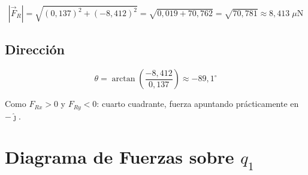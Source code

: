 \documentclass[12pt,letterpaper]{article}
\begin{document}
\begin{equation*}
|\vec{F}_R| = \sqrt{(0{,}137)^2 + (-8{,}412)^2}
= \sqrt{0{,}019 + 70{,}762}
= \sqrt{70{,}781}
\approx 8{,}413\;\mu\text{N}
\end{equation*}

\subsection*{Direcci\'on}

\begin{equation*}
\theta = \arctan\!\left(\frac{-8{,}412}{0{,}137}\right) \approx -89{,}1^\circ
\end{equation*}

Como $F_{Rx}>0$ y $F_{Ry}<0$: cuarto cuadrante, fuerza apuntando pr\'acticamente en $-\hat{\jmath}$.

\section*{Diagrama de Fuerzas sobre $q_1$}
\end{document}

